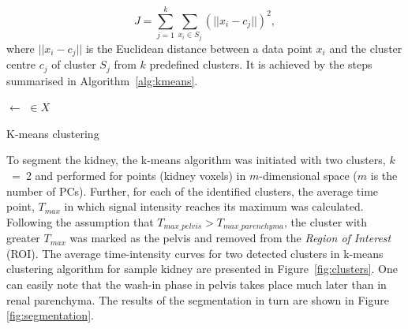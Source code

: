 \begin{equation}
	\label{eq:kmeans}
	J = \sum_{j=1}^{k}\sum_{x_i \in S_j}(||x_i-c_j||)^2,
\end{equation}
where $||x_i-c_j||$ is  the Euclidean distance between a data point $x_i$ and the cluster centre $c_j$ of cluster $S_j$ from $k$ predefined clusters. It is achieved by the steps summarised in Algorithm~\ref{alg:kmeans}.

\vspace{16pt}
\begin{algorithm}[H]
\footnotesize
    
	
    
    \BlankLine
    \BlankLine
    
    
	\DontPrintSemicolon
	\Centroids $\leftarrow$  \Centroids$\in X$\;
    
	  
    
    
    \caption{K-means clustering}
    \label{alg:kmeans}
\end{algorithm}

\vspace{16pt}
To segment the kidney, the k-means algorithm was initiated with two clusters, $k$~=~2 and performed for points (kidney voxels) in $m$-dimensional space ($m$ is the number of PCs).
Further, for each of the identified clusters, the average time point, $T_{max}$ in which signal intensity reaches its maximum was calculated. 
Following the assumption that $T_{max\_pelvis}>T_{max\_parenchyma}$, the cluster with greater $T_{max}$ was marked as the pelvis and removed from the \textit{Region of Interest} (ROI).
The average time-intensity curves for two detected clusters in k-means clustering algorithm for sample kidney are presented in Figure~\ref{fig:clusters}. One can easily note that the wash-in phase in pelvis takes place much later than in renal parenchyma. The results of the segmentation in turn are shown in Figure \ref{fig:segmentation}.  


